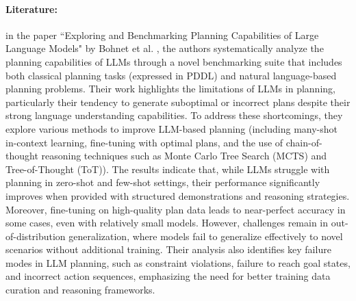 \paragraph{Literature:}
in the paper ``Exploring and Benchmarking Planning Capabilities of Large Language
Models" by Bohnet et al. \cite{bohnet2024exploringbenchmarkingplanningcapabilities},
the authors systematically analyze the planning capabilities of LLMs through a
novel benchmarking suite that includes both classical planning tasks (expressed in
PDDL) and natural language-based planning problems. Their work highlights the limitations
of LLMs in planning, particularly their tendency to generate suboptimal or
incorrect plans despite their strong language understanding capabilities. To address
these shortcomings, they explore various methods to improve LLM-based planning (including
many-shot in-context learning, fine-tuning with optimal plans, and the use of chain-of-thought
reasoning techniques such as Monte Carlo Tree Search (MCTS) and Tree-of-Thought (ToT)).
The results indicate that, while LLMs struggle with planning in zero-shot and
few-shot settings, their performance significantly improves when provided with structured
demonstrations and reasoning strategies. Moreover, fine-tuning on high-quality plan
data leads to near-perfect accuracy in some cases, even with relatively small
models. However, challenges remain in out-of-distribution generalization, where models
fail to generalize effectively to novel scenarios without additional training.
Their analysis also identifies key failure modes in LLM planning, such as constraint
violations, failure to reach goal states, and incorrect action sequences,
emphasizing the need for better training data curation and reasoning frameworks.

